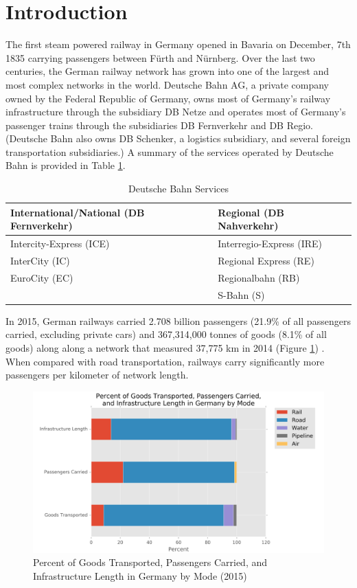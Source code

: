 \documentclass{article}
\begin{document}
\section{Introduction}
The first steam powered railway in Germany opened in Bavaria on December, 7th 1835 carrying passengers between Fürth and Nürnberg. Over the last two centuries, the German railway network has grown into one of the largest and most complex networks in the world. Deutsche Bahn AG, a private company owned by the Federal Republic of Germany, owns most of Germany's railway infrastructure through the subsidiary DB Netze and operates most of Germany's passenger trains through the subsidiaries DB Fernverkehr and DB Regio. (Deutsche Bahn also owns DB Schenker, a logistics subsidiary, and several foreign transportation subsidiaries.) A summary of the services operated by Deutsche Bahn is provided in Table \ref{table:services}.

\begin{table}[H]
  \centering
\begin{tabular}{ l | l }
International/National (DB Fernverkehr) & Regional (DB Nahverkehr) \\
\hline
Intercity-Express (ICE) & Interregio-Express (IRE) \\
InterCity (IC) & Regional Express (RE) \\
EuroCity (EC) & Regionalbahn (RB) \\
 & S-Bahn (S)\\
\end{tabular}
    \caption{Deutsche Bahn Services \citep{db}}
    \label{table:services}
\end{table}

In 2015, German railways carried 2.708 billion passengers (21.9\% of all passengers carried, excluding private cars) and 367,314,000 tonnes of goods (8.1\% of all goods) along along a network that measured 37,775 km in 2014 (Figure \ref{fig:comparison}) \citep{destatis}. When compared with road transportation, railways carry significantly more passengers per kilometer of network length.

\begin{figure}[H]
    \centering
    \includegraphics[width=\textwidth]{comparison.png}
    \caption{Percent of Goods Transported, Passengers Carried, and Infrastructure Length in Germany by Mode (2015) \citep{destatis}}
    \label{fig:comparison}
\end{figure}
\end{document}
